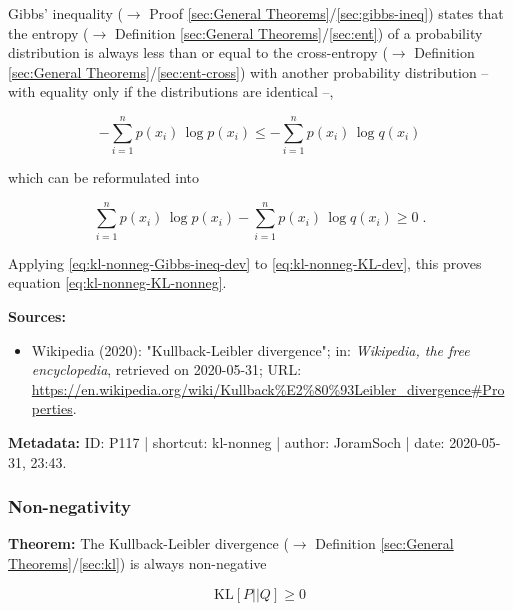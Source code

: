 \documentclass[a4paper,12pt,twoside]{book}
\begin{document}
Gibbs' inequality ($\rightarrow$ Proof \ref{sec:General Theorems}/\ref{sec:gibbs-ineq}) states that the entropy ($\rightarrow$ Definition \ref{sec:General Theorems}/\ref{sec:ent}) of a probability distribution is always less than or equal to the cross-entropy ($\rightarrow$ Definition \ref{sec:General Theorems}/\ref{sec:ent-cross}) with another probability distribution – with equality only if the distributions are identical –,

\begin{equation} \label{eq:kl-nonneg-Gibbs-ineq}
- \sum_{i=1}^n p(x_i) \, \log p(x_i) \leq - \sum_{i=1}^n p(x_i) \, \log q(x_i)
\end{equation}

which can be reformulated into

\begin{equation} \label{eq:kl-nonneg-Gibbs-ineq-dev}
\sum_{i=1}^n p(x_i) \, \log p(x_i) - \sum_{i=1}^n p(x_i) \, \log q(x_i) \geq 0 \; .
\end{equation}

Applying \eqref{eq:kl-nonneg-Gibbs-ineq-dev} to \eqref{eq:kl-nonneg-KL-dev}, this proves equation \eqref{eq:kl-nonneg-KL-nonneg}.


\vspace{1em}
\textbf{Sources:}
\begin{itemize}
\item Wikipedia (2020): "Kullback-Leibler divergence"; in: \textit{Wikipedia, the free encyclopedia}, retrieved on 2020-05-31; URL: \url{https://en.wikipedia.org/wiki/Kullback%E2%80%93Leibler_divergence#Properties}.
\end{itemize}


\vspace{1em}
\textbf{Metadata:} ID: P117 | shortcut: kl-nonneg | author: JoramSoch | date: 2020-05-31, 23:43.
\vspace{1em}



\subsubsection[\textbf{Non-negativity}]{Non-negativity} \label{sec:kl-nonneg2}
\setcounter{equation}{0}

\textbf{Theorem:} The Kullback-Leibler divergence ($\rightarrow$ Definition \ref{sec:General Theorems}/\ref{sec:kl}) is always non-negative

\begin{equation} \label{eq:kl-nonneg2-KL-nonneg}
\mathrm{KL}[P||Q] \geq 0
\end{equation}
\end{document}
